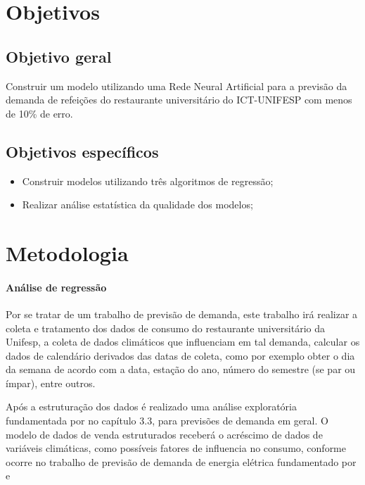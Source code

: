 \documentclass[	12pt, Times, openright, twoside, a4paper, english, brazil]{abntex2}
\begin{document}
      \section{Objetivos}
        \subsection{Objetivo geral}
          Construir um modelo utilizando uma Rede Neural Artificial para a previsão da demanda de
          refeições do restaurante universitário do ICT-UNIFESP com menos de 10\% de erro.
        
        \subsection{Objetivos específicos}
          \begin{itemize}
          \item Construir modelos utilizando três algoritmos de regressão; 
          \item Realizar análise estatística da qualidade dos modelos;
          \end{itemize}

      \section{Metodologia}
        \paragraph*{Análise de regressão}

          Por se tratar de um trabalho de previsão de demanda,  este trabalho irá realizar a coleta e tratamento dos dados de consumo do restaurante universitário da Unifesp, a coleta de dados climáticos que influenciam em tal demanda, calcular os dados de calendário derivados das datas de coleta, como por exemplo obter o dia da semana de acordo com a data, estação do ano, número do semestre (se par ou ímpar), entre outros.

          Após a estruturação dos dados é realizado uma análise exploratória fundamentada por \cite{Junior2007} no capítulo 3.3, para previsões de demanda em geral.
          O modelo de dados de venda estruturados receberá o acréscimo de dados de variáveis climáticas, como possíveis fatores de influencia no consumo, conforme ocorre no trabalho de previsão de demanda de energia elétrica fundamentado por \cite{Almeida2013} \cite{Ruas2012} e \cite{Silva2010}
\end{document}
